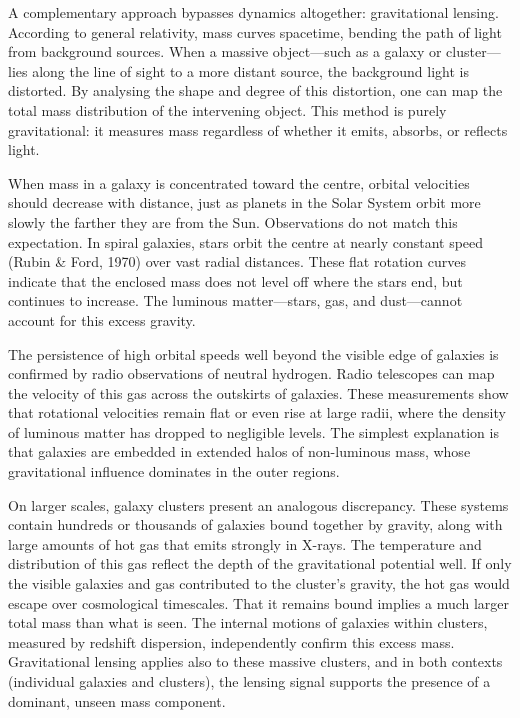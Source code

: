 A complementary approach bypasses dynamics altogether: gravitational lensing. According to general relativity, mass curves spacetime, bending the path of light from background sources. When a massive object—such as a galaxy or cluster—lies along the line of sight to a more distant source, the background light is distorted. By analysing the shape and degree of this distortion, one can map the total mass distribution of the intervening object. This method is purely gravitational: it measures mass regardless of whether it emits, absorbs, or reflects light.

When mass in a galaxy is concentrated toward the centre, orbital velocities should decrease with distance, just as planets in the Solar System orbit more slowly the farther they are from the Sun. Observations do not match this expectation. In spiral galaxies, stars orbit the centre at nearly constant speed (Rubin \& Ford, 1970) over vast radial distances. These flat rotation curves indicate that the enclosed mass does not level off where the stars end, but continues to increase. The luminous matter—stars, gas, and dust—cannot account for this excess gravity.

The persistence of high orbital speeds well beyond the visible edge of galaxies is confirmed by radio observations of neutral hydrogen. Radio telescopes can map the velocity of this gas across the outskirts of galaxies. These measurements show that rotational velocities remain flat or even rise at large radii, where the density of luminous matter has dropped to negligible levels. The simplest explanation is that galaxies are embedded in extended halos of non-luminous mass, whose gravitational influence dominates in the outer regions.

On larger scales, galaxy clusters present an analogous discrepancy. These systems contain hundreds or thousands of galaxies bound together by gravity, along with large amounts of hot gas that emits strongly in X-rays. The temperature and distribution of this gas reflect the depth of the gravitational potential well. If only the visible galaxies and gas contributed to the cluster’s gravity, the hot gas would escape over cosmological timescales. That it remains bound implies a much larger total mass than what is seen. The internal motions of galaxies within clusters, measured by redshift dispersion, independently confirm this excess mass. Gravitational lensing applies also to these massive clusters, and in both contexts (individual galaxies and clusters), the lensing signal supports the presence of a dominant, unseen mass component.

